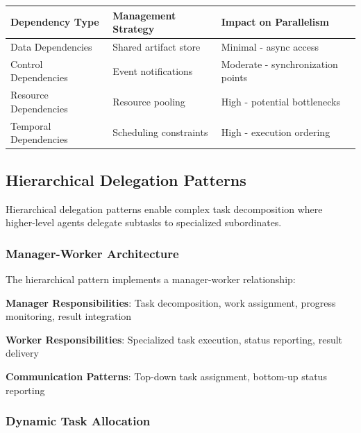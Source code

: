 \begin{center}
\begin{tabular}{@{}lll@{}}
\toprule
\textbf{Dependency Type} & \textbf{Management Strategy} & \textbf{Impact on Parallelism} \\
\midrule
Data Dependencies & Shared artifact store & Minimal - async access \\
Control Dependencies & Event notifications & Moderate - synchronization points \\
Resource Dependencies & Resource pooling & High - potential bottlenecks \\
Temporal Dependencies & Scheduling constraints & High - execution ordering \\
\bottomrule
\end{tabular}
\end{center}

\subsection*{Hierarchical Delegation Patterns}

Hierarchical delegation patterns enable complex task decomposition where higher-level agents delegate subtasks to specialized subordinates.

\subsubsection*{Manager-Worker Architecture}

The hierarchical pattern implements a manager-worker relationship:

\begin{compactlist}
    \item \textbf{Manager Responsibilities}: Task decomposition, work assignment, progress monitoring, result integration
    \item \textbf{Worker Responsibilities}: Specialized task execution, status reporting, result delivery
    \item \textbf{Communication Patterns}: Top-down task assignment, bottom-up status reporting
\end{compactlist}

\subsubsection*{Dynamic Task Allocation}

